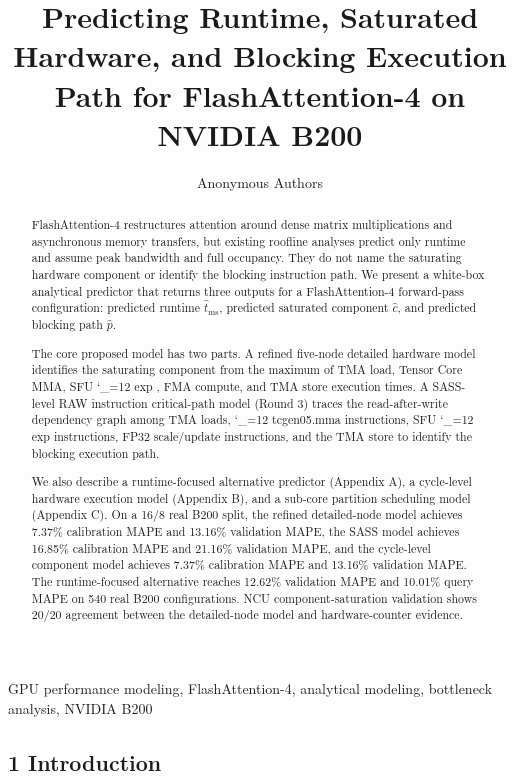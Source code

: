 \documentclass[
  10pt,journal,compsoc,twoside]{IEEEtran}
\title{Predicting Runtime, Saturated Hardware, and Blocking Execution
Path for FlashAttention-4 on NVIDIA B200}
\author{Anonymous Authors}
\date{}
\renewcommand{\texttt}[1]{%
  \begingroup
  \ttfamily
  \catcode`_=12
  \def\_{\char`\_\allowbreak}%
  #1%
  \endgroup
}
\begin{document}
\maketitle
\begin{abstract}
FlashAttention-4 restructures attention around dense matrix
multiplications and asynchronous memory transfers, but existing roofline
analyses predict only runtime and assume peak bandwidth and full
occupancy. They do not name the saturating hardware component or
identify the blocking instruction path. We present a white-box
analytical predictor that returns three outputs for a FlashAttention-4
forward-pass configuration: predicted runtime \(\hat{t}_{\text{ms}}\),
predicted saturated component \(\hat{c}\), and predicted blocking path
\(\hat{p}\).

The core proposed model has two parts. A refined five-node detailed
hardware model identifies the saturating component from the maximum of
TMA load, Tensor Core MMA, SFU \texttt{exp}, FMA compute, and TMA store
execution times. A SASS-level RAW instruction critical-path model (Round
3) traces the read-after-write dependency graph among TMA loads,
\texttt{tcgen05.mma} instructions, SFU \texttt{exp} instructions, FP32
scale/update instructions, and the TMA store to identify the blocking
execution path.

We also describe a runtime-focused alternative predictor (Appendix A), a
cycle-level hardware execution model (Appendix B), and a sub-core
partition scheduling model (Appendix C). On a 16/8 real B200 split, the
refined detailed-node model achieves 7.37\% calibration MAPE and 13.16\%
validation MAPE, the SASS model achieves 16.85\% calibration MAPE and
21.16\% validation MAPE, and the cycle-level component model achieves
7.37\% calibration MAPE and 13.16\% validation MAPE. The runtime-focused
alternative reaches 12.62\% validation MAPE and 10.01\% query MAPE on
540 real B200 configurations. NCU component-saturation validation shows
20/20 agreement between the detailed-node model and hardware-counter
evidence.
\end{abstract}

\begin{IEEEkeywords}
GPU performance modeling, FlashAttention-4, analytical modeling, bottleneck analysis, NVIDIA B200
\end{IEEEkeywords}

\subsection{1 Introduction}\label{introduction}
\end{document}
